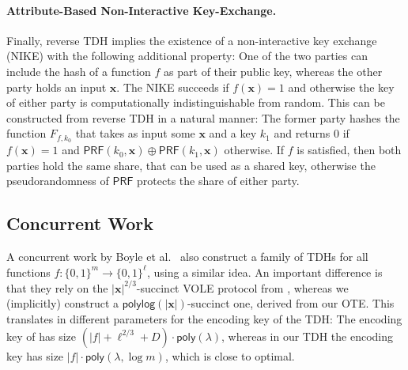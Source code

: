 \documentclass{article}
\newcommand{\poly}{\mathsf{poly}}
\newcommand{\polylog}{\mathsf{polylog}}
\renewcommand{\sec}{\ensuremath{\lambda}}
\begin{document}
\paragraph{Attribute-Based Non-Interactive Key-Exchange.} Finally, reverse TDH implies the existence of a non-interactive key exchange (NIKE) with the following additional property: One of the two parties can include the hash of a function $f$ as part of their public key, whereas the other party holds an input $\mathbf{x}$. The NIKE succeeds if $f(\mathbf{x}) = 1$ and otherwise the key of either party is computationally indistinguishable from random. This can be constructed from reverse TDH in a natural manner: The former party hashes the function $F_{f, k_0}$ that takes as input some $\mathbf{x}$ and a key $k_1$ and returns $0$ if $f(\mathbf{x}) = 1$ and $\mathsf{PRF}(k_0 , \mathbf{x}) \oplus \mathsf{PRF}(k_1 , \mathbf{x})$ otherwise. If $f$ is satisfied, then both parties hold the same share, that can be used as a shared key, otherwise the pseudorandomness of $\mathsf{PRF}$ protects the share of either party. 




\subsection{Concurrent Work}

A concurrent work by Boyle et al.~\cite{EC:BJSS25} also construct a family of TDHs for all functions $f:\{0,1\}^m \to \{0,1\}^\ell$, using a similar idea. An important difference is that they rely on the $|\mathbf{x}|^{2/3}$-succinct VOLE protocol from \cite{EC:AbrRoySch24}, whereas we (implicitly) construct a $\polylog(|\mathbf{x}|)$-succinct one, derived from our OTE. This translates in different parameters for the encoding key of the TDH: The encoding key of \cite{EC:BJSS25} has size $(|f|+ \ell^{2/3} + D)\cdot \poly(\sec)$, whereas in our TDH the encoding key has size $\lvert f\rvert \cdot \poly(\sec, \log m)$, which is close to optimal.
\end{document}
